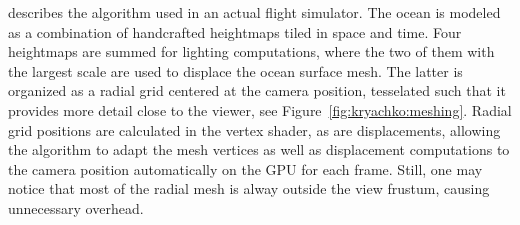 \cite{Kryachko:2005} describes the algorithm used in an actual flight simulator.
The ocean is modeled as a combination of handcrafted heightmaps tiled in space
and time. Four heightmaps are summed for lighting computations, where the two of them
with the largest scale are used to displace the ocean surface mesh. The latter is
organized as a radial grid centered at the camera position, tesselated such that
it provides more detail close to the viewer, see Figure~\ref{fig:kryachko:meshing}.
Radial grid positions are calculated in the vertex shader, as are displacements,
allowing the algorithm to adapt the mesh vertices as well as displacement computations
to the camera position automatically on the GPU for each frame. Still, one may
notice that most of the radial mesh is alway outside the view frustum,
causing unnecessary overhead.
%
%
\begin{figure}
 \centering
 \hfill
\end{figure}
